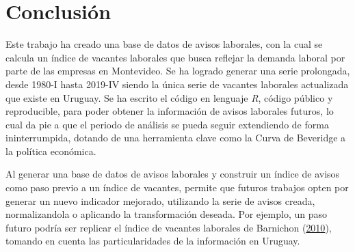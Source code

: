 \documentclass[12pt,oneside]{reedthesis}
\begin{document}
\hypertarget{conclusiuxf3n}{%
\chapter*{Conclusión}\label{conclusiuxf3n}}

Este trabajo ha creado una base de datos de avisos laborales, con la cual se calcula un índice de vacantes laborales que busca reflejar la demanda laboral por parte de las empresas en Montevideo. Se ha logrado generar una serie prolongada, desde 1980-I hasta 2019-IV siendo la única serie de vacantes laborales actualizada que existe en Uruguay. Se ha escrito el código en lenguaje \emph{R}, código público y reproducible, para poder obtener la información de avisos laborales futuros, lo cual da pie a que el periodo de análisis se pueda seguir extendiendo de forma ininterrumpida, dotando de una herramienta clave como la Curva de Beveridge a la política económica.

Al generar una base de datos de avisos laborales y construir un índice de avisos como paso previo a un índice de vacantes, permite que futuros trabajos opten por generar un nuevo indicador mejorado, utilizando la serie de avisos creada, normalizandola o aplicando la transformación deseada. Por ejemplo, un paso futuro podría ser replicar el índice de vacantes laborales de Barnichon (\protect\hyperlink{ref-Barnichon2010}{2010}), tomando en cuenta las particularidades de la información en Uruguay.
\end{document}
